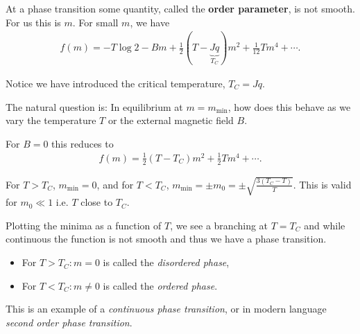 At a phase transition some quantity, called the \textbf{order parameter}, is not smooth. For us this is $m$. For small $m$, we have
\begin{align}
    f\left( m \right) = - T \log 2 - Bm + \frac{1}{2} \left( T - \underbrace{Jq}_{T_C} \right) m^2 + \frac{1}{12} T m^{4} + \cdots
.\end{align}

Notice we have introduced the critical temperature, $T_C = Jq$.

The natural question is: In equilibrium at $m = m_\text{min}$, how does this behave as we vary the temperature $T$ or the external magnetic field $B$.

For $B = 0$ this reduces to
\begin{align}
    f \left( m \right) = \frac{1}{2} \left( T - T_C \right) m^2 + \frac{1}{2} T m^{4} + \cdots
.\end{align}

For $T > T_C$, $m_\text{min} = 0$, and for $T < T_C$, $m_{\text{min}} = \pm m_0 = \pm \sqrt{\frac{3 \left( T_C - T \right) }{T}}$. This is valid for $m_0 \ll 1$ i.e. $T$ close to $T_C$. 

Plotting the minima as a function of $T$, we see a branching at $T = T_C$ and while continuous the function is not smooth and thus we have a phase transition.

\begin{itemize}
    \item For $T > T_C : m = 0$ is called the \textit{disordered phase},
    \item For $T < T_C : m \neq 0$ is called the \textit{ordered phase}.
\end{itemize}

This is an example of a \textit{continuous phase transition}, or in modern language \textit{second order phase transition}.

